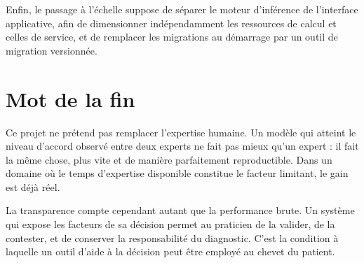 Enfin, le passage à l'échelle suppose de séparer le moteur d'inférence de
l'interface applicative, afin de dimensionner indépendamment les ressources de calcul
et celles de service, et de remplacer les migrations au démarrage par un outil de
migration versionnée.

\section*{Mot de la fin}

Ce projet ne prétend pas remplacer l'expertise humaine. Un modèle qui atteint le
niveau d'accord observé entre deux experts ne fait pas mieux qu'un expert : il fait la
même chose, plus vite et de manière parfaitement reproductible. Dans un domaine où le
temps d'expertise disponible constitue le facteur limitant, le gain est déjà réel.

La transparence compte cependant autant que la performance brute. Un système qui
expose les facteurs de sa décision permet au praticien de la valider, de la contester,
et de conserver la responsabilité du diagnostic. C'est la condition à laquelle un outil
d'aide à la décision peut être employé au chevet du patient.
